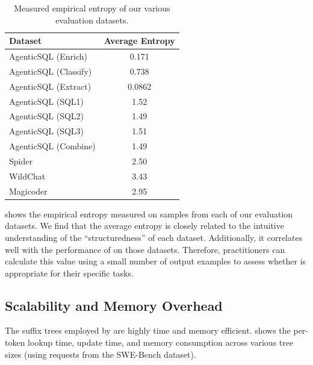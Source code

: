 \begin{table}[htbp]
\caption{Measured empirical entropy of our various evaluation datasets.}
\label{suffixdecoding:tab:entropy}
\centering
\begin{tabular}{lc}
\toprule
Dataset & Average Entropy \\
\midrule
AgenticSQL (Enrich)   & 0.171 \\
AgenticSQL (Classify) & 0.738 \\
AgenticSQL (Extract)  & 0.0862 \\
AgenticSQL (SQL1)     & 1.52 \\
AgenticSQL (SQL2)     & 1.49 \\
AgenticSQL (SQL3)     & 1.51 \\
AgenticSQL (Combine)  & 1.49 \\
Spider                & 2.50 \\
WildChat              & 3.43 \\
Magicoder             & 2.95 \\
\bottomrule
\end{tabular}
\end{table}

 shows the empirical entropy measured on samples from each of our evaluation datasets. We find that the average entropy is closely related to the intuitive understanding of the ``structuredness'' of each dataset. Additionally, it correlates well with the performance of \SuffixDecoding on those datasets. Therefore, practitioners can calculate this value using a small number of output examples to assess whether \SuffixDecoding is appropriate for their specific tasks.

\subsection{Scalability and Memory Overhead}
\label{suffixdecoding:sec:scalability}

The suffix trees employed by \SuffixDecoding are highly time and memory efficient.  shows the per-token lookup time, update time, and memory consumption across various tree sizes (using requests from the SWE-Bench dataset).

